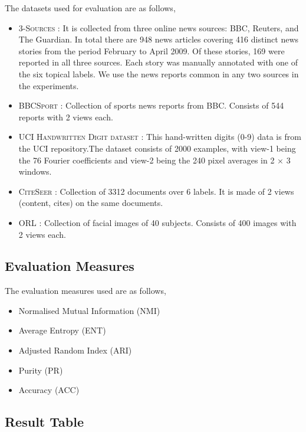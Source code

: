 \documentclass[a4paper]{article}
\begin{document}
	The datasets used for evaluation are as follows,
	\begin{itemize}
	\item \textsc{3-Sources} : It is collected from three online news sources: BBC, Reuters, and The Guardian. In total there are 948 news articles covering 416 distinct news stories from the period February to April 2009. Of these stories, 169 were reported in all three sources. Each story was manually annotated with one of the six topical labels. We use the news reports common in any two sources in the experiments.
	\item \textsc{BBCSport} : Collection of sports news reports from BBC. Consists of 544 reports with 2 views each.
	\item \textsc{UCI Handwritten Digit dataset} : This hand-written digits (0-9) data is from the UCI repository.The dataset consists of 2000 examples, with view-1 being the 76 Fourier coefficients and view-2 being the 240 pixel averages in 2 × 3 windows.	
	\item \textsc{CiteSeer} : Collection of 3312 documents over 6 labels. It is made of 2 views (content, cites) on the same documents.
	\item \textsc{ORL} : Collection of facial images of 40 subjects. Consists of 400 images with 2 views each.	
	\end{itemize}

	\subsection{Evaluation Measures}

	The evaluation measures used are as follows,
	\begin{itemize}
	\item {Normalised Mutual Information (NMI)}
	\item {Average Entropy (ENT)}
	\item {Adjusted Random Index (ARI)}
	\item {Purity (PR)}
	\item {Accuracy (ACC)}
	\end{itemize}
	

	\subsection{Result Table}	
\end{document}
